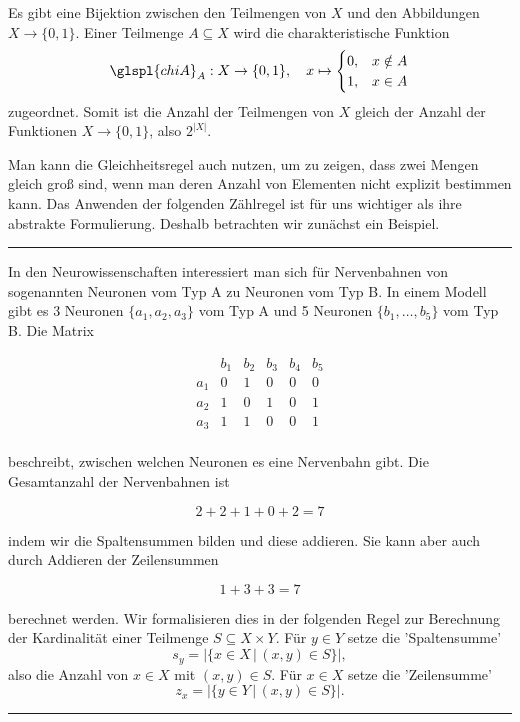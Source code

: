 \documentclass[9pt]{article}
\begin{document}
\begin{bsp}
Es gibt eine Bijektion zwischen den Teilmengen von $X$ und den Abbildungen $X \to \{0, 1\}$. Einer Teilmenge $A \subseteq X$ wird die charakteristische Funktion
\[
\glspl{chiA}_A: X \to \{0, 1\}, \quad x \mapsto 
\begin{cases} 
0, & x \notin A \\
1, & x \in A 
\end{cases}
\]
zugeordnet. Somit ist die Anzahl der Teilmengen von $X$ gleich der Anzahl der Funktionen $X \to \{0, 1\}$, also $2^{|X|}$.

Man kann die Gleichheitsregel auch nutzen, um zu zeigen, dass zwei Mengen gleich groß sind, wenn man deren Anzahl von Elementen nicht explizit bestimmen kann. Das Anwenden der folgenden Zählregel ist für uns wichtiger als ihre abstrakte Formulierung. Deshalb betrachten wir zunächst ein Beispiel.

\end{bsp} \noindent \rule{8cm}{0.4pt} 

\begin{bsp}

In den Neurowissenschaften interessiert man sich für Nervenbahnen von sogenannten Neuronen vom Typ A zu Neuronen vom Typ B. In einem Modell gibt es 3 Neuronen $\{a_1, a_2, a_3\}$ vom Typ A und 5 Neuronen $\{b_1, \ldots, b_5\}$ vom Typ B. Die Matrix
 
\[
\begin{array}{c|ccccc}
    & b_1 & b_2 & b_3 & b_4 & b_5 \\
\hline
a_1 & 0 & 1 & 0 & 0 & 0 \\
a_2 & 1 & 0 & 1 & 0 & 1 \\
a_3 & 1 & 1 & 0 & 0 & 1 \\
\end{array}
\]

beschreibt, zwischen welchen Neuronen es eine Nervenbahn gibt. Die Gesamtanzahl der Nervenbahnen ist

\[
2 + 2 + 1 + 0 + 2 = 7
\]

indem wir die Spaltensummen bilden und diese addieren. Sie kann aber auch durch Addieren der Zeilensummen

\[
1 + 3 + 3 = 7
\]

berechnet werden.
Wir formalisieren dies in der folgenden Regel zur Berechnung der Kardinalität einer Teilmenge $S \subseteq X \times Y$. Für $y \in Y$ setze die 'Spaltensumme'
\[
s_y = \left| \{ x \in X \,|\, (x, y) \in S \} \right|,
\]
also die Anzahl von $x \in X$ mit $(x, y) \in S$. Für $x \in X$ setze die 'Zeilensumme'
\[
z_x = \left| \{ y \in Y \,|\, (x, y) \in S \} \right|.
\]
\end{bsp} \noindent \rule{8cm}{0.4pt}
\end{document}
